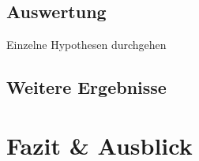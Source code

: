 \documentclass[intern]{cgMA}
\begin{document}
\subsection{Auswertung}
Einzelne Hypothesen durchgehen
\subsection{Weitere Ergebnisse}
\section{Fazit \& Ausblick}
\newpage
\thispagestyle{empty}
\quad 
\newpage
{}
\printbibliography
\newpage
\thispagestyle{empty}
\quad 
\newpage
\clearpage         %
\listoffigures   %
\clearpage
\newpage
\thispagestyle{empty}
\quad 
\newpage
\end{document}
